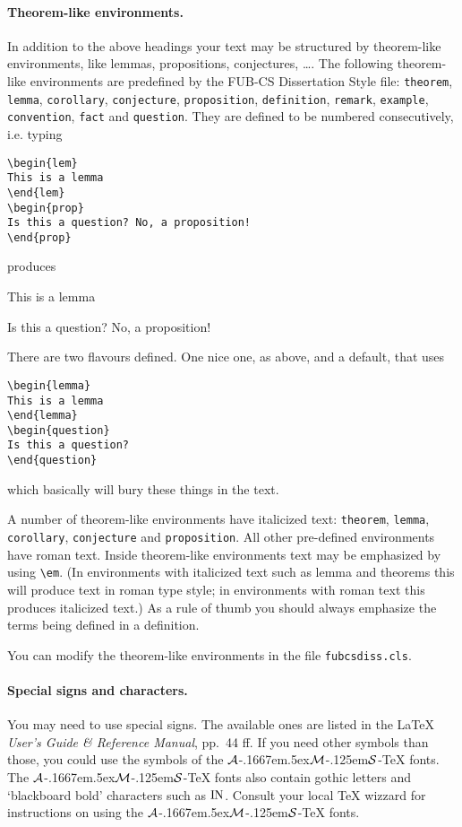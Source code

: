 \paragraph*{Theorem-like environments.}
In addition to the above headings your text may be structured 
by theorem-like environments, like lemmas, propositions, conjectures, \ldots .
The following theorem-like environments are predefined by the FUB-CS Dissertation 
Style file: \verb|theorem|, \verb|lemma|, \verb|corollary|, \verb|conjecture|, 
\verb|proposition|, \verb|definition|, \verb|remark|, 
\verb|example|, \verb|convention|, \verb|fact| and \verb|question|.
They are defined to be numbered consecutively, i.e. typing
\begin{verbatim}
\begin{lem}
This is a lemma
\end{lem}
\begin{prop}
Is this a question? No, a proposition!
\end{prop}
\end{verbatim}
produces
\begin{lem}
This is a lemma
\end{lem}
\begin{prop}
Is this a question? No, a proposition!
\end{prop}
\noindent There are two flavours defined. One nice one, as above, and a default, that uses
\begin{verbatim}
\begin{lemma}
This is a lemma
\end{lemma}
\begin{question}
Is this a question? 
\end{question}
\end{verbatim}
\noindent which basically will bury these things in the text.

A number of theorem-like environments have italicized text:
\verb|theorem|, \verb|lemma|, \verb|corollary|, \verb|conjecture|
and \verb|proposition|. All other pre-defined environments have roman text.
Inside theorem-like environments text may be emphasized by
using \verb|\em|. (In environments with italicized text such as lemma
and theorems this will produce text in roman type style; in 
environments with roman text this produces italicized text.)
As a rule of thumb you should always emphasize the terms being
defined in a definition.

You can modify the theorem-like environments in the file \texttt{fubcsdiss.cls}.

\paragraph*{Special signs and characters.}
\newcommand{\AmSTeX}{%
{$\cal A$}\kern-.1667em\lower.5ex\hbox
  {$\cal M$}\kern-.125em{$\cal S$}-\TeX
}
You may need to use special signs. The available ones are listed
in the \LaTeX{} {\em User's Guide \& Reference Manual\/}, pp.~44 ff.
If you need other symbols than those, you could use the symbols
of the \AmSTeX{} fonts. The  \AmSTeX{} fonts also contain gothic letters
and `blackboard bold' characters such as ${\rm I}\hskip -.3pt{\rm N}$. Consult
your local \TeX{} wizzard for instructions on using the \AmSTeX{} fonts.

